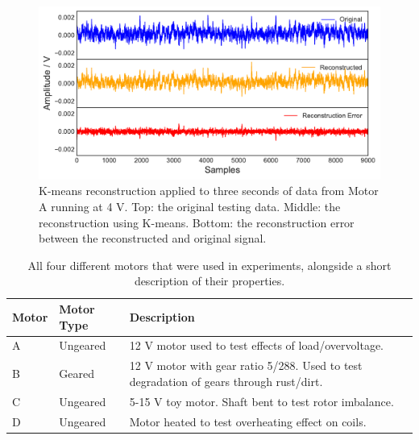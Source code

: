 \begin{figure}[t]
    \includegraphics[width=1.0\textwidth]{fig/kmeans_large_4Vnowater.pdf}
    \caption[K-means Large Motor Reconstruction No Water]{K-means reconstruction applied to three seconds of data from Motor A running at 4 V. Top: the original testing data. Middle: the reconstruction using K-means. Bottom: the reconstruction error between the reconstructed and original signal.}
    \label{fig:kmeans_large4V}
\end{figure}

\begin{table}[]
    \centering
    \begin{tabular}{|p{1cm}|p{1cm}|p{10cm}|}
    \hline
    \textbf{Motor}          & \textbf{Motor Type}        & \textbf{Description}                                                                          \\ \hline
    \multicolumn{1}{|l|}{A} & \multicolumn{1}{l|}{Ungeared} & 12 V motor used to test effects of load/overvoltage.                            \\
    \multicolumn{1}{|l|}{B} & \multicolumn{1}{l|}{Geared} & 12 V motor with gear ratio 5/288. Used to test degradation of gears through rust/dirt. \\
    \multicolumn{1}{|l|}{C} & \multicolumn{1}{l|}{Ungeared} & 5-15 V toy motor. Shaft bent to test rotor imbalance.                                \\
    \multicolumn{1}{|l|}{D} & \multicolumn{1}{l|}{Ungeared}   & Motor heated to test overheating effect on coils.                          \\ \hline
    \end{tabular}
    \caption[Motor Descriptions]{All four different motors that were used in experiments, alongside a short description of their properties.}
    \label{motor_table}
\end{table}

